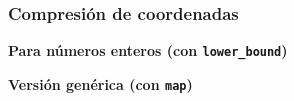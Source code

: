 \subsubsection{Compresión de coordenadas}
    \textbf{Para números enteros (con \texttt{lower\_bound})}
    

    \textbf{Versión genérica (con \texttt{map})}
    